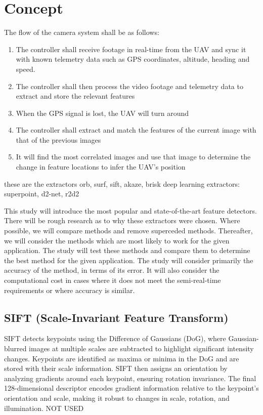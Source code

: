 \section*{Concept}

The flow of the camera system shall be as follows:

\begin{enumerate}
    \item The controller shall receive footage in real-time from the UAV and sync it with known telemetry data such as GPS coordinates, altitude, heading and speed.
    \item The controller shall then process the video footage and telemetry data to extract and store the relevant features
    \item When the GPS signal is lost, the UAV will turn around
    \item The controller shall extract and match the features of the current image with that of the previous images
    \item It will find the most correlated images and use that image to determine the change in feature locations to infer the UAV's position
\end{enumerate}


these are the extractors
orb, surf, sift, akaze, brisk
deep learning extractors: superpoint, d2-net, r2d2

This study will introduce the most popular and state-of-the-art feature detectors. There will be rough research as to why these extractors were chosen. Where possible, we will compare methods and remove superceded methods. Thereafter, we will consider the methods which are most likely to work for the given application. The study will test these methods and compare them to determine the best method for the given application. The study will consider primarily the accuracy of the method, in terms of its error. It will also consider the computational cost in cases where it does not meet the semi-real-time requirements or where accuracy is similar. 


\subsection*{SIFT (Scale-Invariant Feature Transform)}
SIFT detects keypoints using the Difference of Gaussians (DoG), where Gaussian-blurred images at multiple scales are subtracted to highlight significant intensity changes. Keypoints are identified as maxima or minima in the DoG and are stored with their scale information. SIFT then assigns an orientation by analyzing gradients around each keypoint, ensuring rotation invariance. The final 128-dimensional descriptor encodes gradient information relative to the keypoint’s orientation and scale, making it robust to changes in scale, rotation, and illumination.
NOT USED 

